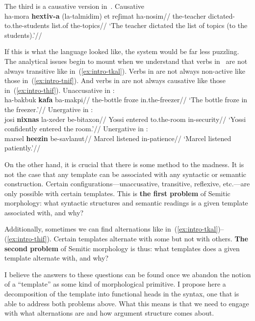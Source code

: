 The third is a causative version in~{\thif}.
\ex \label{ex:intro-thif}Causative {\thif}\\
		\begingl
		\gla ha-mora \textbf{hextiv-a} (la-talmidim) et reʃimat ha-nosim//
		\glb the-teacher dictated- to.the-students  list.of the-topics//
		\glft `The teacher dictated the list of topics (to the students).'//
	\endgl
\xe

If this is what the language looked like, the system would be far less puzzling. The analytical issues begin to mount when we understand that verbs in~{\tkal} are not always transitive like in~(\ref{ex:intro-tkal}). Verbs in {\tnif} are not always non-active like those in~(\ref{ex:intro-tnif}). And verbs in {\thif} are not always causative like those in~(\ref{ex:intro-thif}).
\pex
	\a Unaccusative in {\tkal}:\\
		\begingl
		\gla ha-bakbuk \textbf{kafa} ba-makpi//
		\glb the-bottle froze in.the-freezer//
		\glft `The bottle froze in the freezer.'//
	\endgl	
	\a Unergative in {\tnif}:\\
		\begingl
		\gla josi \textbf{nixnas} la-xeder be-bitaxon//
		\glb Yossi entered to.the-room in-security//
		\glft `Yossi confidently entered the room.'//
	\endgl
	\a Unergative in {\thif}:\\
		\begingl
		\gla marsel \textbf{heezin} be-savlanut//
		\glb Marcel listened in-patience//
		\glft `Marcel listened patiently.'//
	\endgl
\xe

On the other hand, it is crucial that there is some method to the madness. It is not the case that any template can be associated with any syntactic or semantic construction. Certain configurations---unaccusative, transitive, reflexive, etc.---are only possible with certain templates. This is \textbf{the first problem} of Semitic morphology: what syntactic structures and semantic readings is a given template associated with, and why?

Additionally, sometimes we can find alternations like in~(\ref{ex:intro-tkal})--(\ref{ex:intro-thif}). Certain templates alternate with some but not with others. \textbf{The second problem} of Semitic morphology is thus: what templates does a given template alternate with, and why?

I believe the answers to these questions can be found once we abandon the notion of a ``template'' as some kind of morphological primitive. I propose here a decomposition of the template into functional heads in the syntax, one that is able to address both problems above. What this means is that we need to engage with what alternations are and how argument structure comes about.

